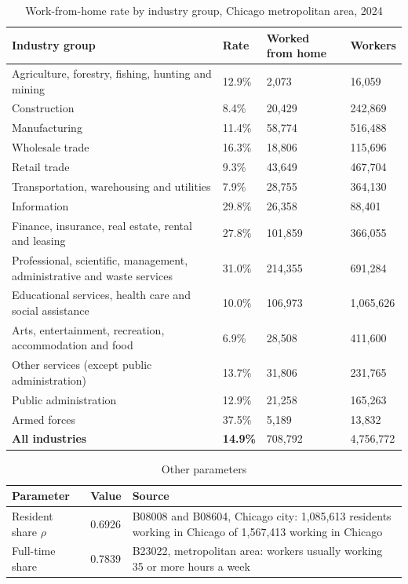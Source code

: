 \documentclass[12pt,letterpaper]{article}
\begin{document}
\begin{table}[H]
\centering
\caption{Work-from-home rate by industry group, Chicago metropolitan area, 2024}
\label{tab:wfh}
\footnotesize
\begin{tabular}{@{}L{3.0in}C{0.6in}C{0.9in}C{0.9in}@{}}
\toprule
\textbf{Industry group} & \textbf{Rate} & \textbf{Worked from home} & \textbf{Workers} \\
\midrule
Agriculture, forestry, fishing, hunting and mining & 12.9\% & 2,073 & 16,059 \\
Construction & 8.4\% & 20,429 & 242,869 \\
Manufacturing & 11.4\% & 58,774 & 516,488 \\
Wholesale trade & 16.3\% & 18,806 & 115,696 \\
Retail trade & 9.3\% & 43,649 & 467,704 \\
Transportation, warehousing and utilities & 7.9\% & 28,755 & 364,130 \\
Information & 29.8\% & 26,358 & 88,401 \\
Finance, insurance, real estate, rental and leasing & 27.8\% & 101,859 & 366,055 \\
Professional, scientific, management, administrative and waste services & 31.0\% & 214,355 & 691,284 \\
Educational services, health care and social assistance & 10.0\% & 106,973 & 1,065,626 \\
Arts, entertainment, recreation, accommodation and food & 6.9\% & 28,508 & 411,600 \\
Other services (except public administration) & 13.7\% & 31,806 & 231,765 \\
Public administration & 12.9\% & 21,258 & 165,263 \\
Armed forces & 37.5\% & 5,189 & 13,832 \\
\midrule
\textbf{All industries} & \textbf{14.9\%} & 708,792 & 4,756,772 \\
\bottomrule
\end{tabular}
\end{table}

\begin{table}[H]
\centering
\caption{Other parameters}
\label{tab:params}
\small
\begin{tabular}{@{}L{2.0in}C{0.8in}L{2.4in}@{}}
\toprule
\textbf{Parameter} & \textbf{Value} & \textbf{Source} \\
\midrule
Resident share $\rho$ & 0.6926 & B08008 and B08604, Chicago city: 1,085,613 residents working in Chicago of 1,567,413 working in Chicago \\
Full-time share & 0.7839 & B23022, metropolitan area: workers usually working 35 or more hours a week \\
\bottomrule
\end{tabular}
\end{table}
\end{document}
